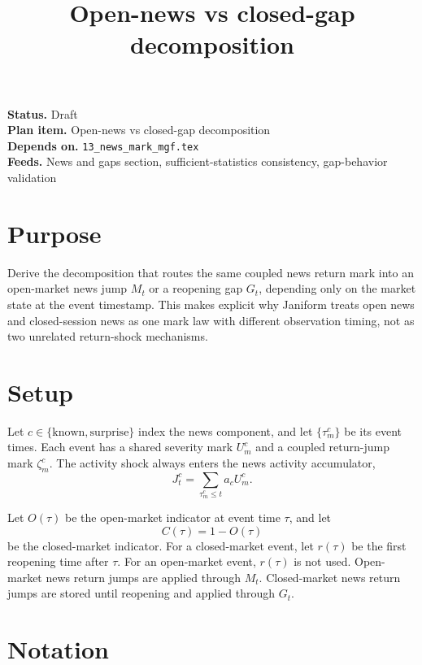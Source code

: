 \documentclass[11pt]{article}
\title{Open-news vs closed-gap decomposition}
\author{}
\date{}
\begin{document}
\maketitle

\noindent\textbf{Status.} Draft\\
\textbf{Plan item.} Open-news vs closed-gap decomposition\\
\textbf{Depends on.} \texttt{13\_news\_mark\_mgf.tex}\\
\textbf{Feeds.} News and gaps section, sufficient-statistics consistency, gap-behavior validation

\section{Purpose}

Derive the decomposition that routes the same coupled news return mark into an
open-market news jump \(M_t\) or a reopening gap \(G_t\), depending only on the
market state at the event timestamp.
This makes explicit why Janiform treats open news and closed-session news as one
mark law with different observation timing, not as two unrelated return-shock
mechanisms.

\section{Setup}

Let \(c\in\{\mathrm{known},\mathrm{surprise}\}\) index the news component, and
let \(\{\tau_m^c\}\) be its event times.
Each event has a shared severity mark \(U_m^c\) and a coupled return-jump
mark \(\zeta_m^c\).
The activity shock always enters the news activity accumulator,
\[
    J_t^c=\sum_{\tau_m^c\le t}a_c U_m^c.
\]

Let \(O(\tau)\) be the open-market indicator at event time \(\tau\), and let
\[
    C(\tau)=1-O(\tau)
\]
be the closed-market indicator.
For a closed-market event, let \(r(\tau)\) be the first reopening time
after \(\tau\).
For an open-market event, \(r(\tau)\) is not used.
Open-market news return jumps are applied through \(M_t\).
Closed-market news return jumps are stored until
reopening and applied through \(G_t\).

\section{Notation}
\end{document}
